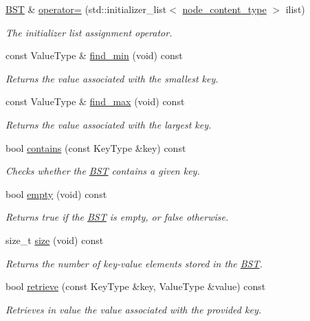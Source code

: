 \begin{DoxyCompactItemize}
\hyperlink{class_b_s_t}{B\+ST} \& \hyperlink{class_b_s_t_abcafcb893066444795e8145684011457}{operator=} (std\+::initializer\+\_\+list$<$ \hyperlink{class_b_s_t_a0aa9307cbee74945dbbbf659c398d4a1}{node\+\_\+content\+\_\+type} $>$ ilist)
\begin{DoxyCompactList}\small\item\em The initializer list assignment operator. \end{DoxyCompactList}\item 
const Value\+Type \& \hyperlink{class_b_s_t_a262042430a5671f2964ec55fd0db5887}{find\+\_\+min} (void) const 
\begin{DoxyCompactList}\small\item\em Returns the value associated with the smallest key. \end{DoxyCompactList}\item 
const Value\+Type \& \hyperlink{class_b_s_t_a1610824df7207dd077fec30b82174a9e}{find\+\_\+max} (void) const 
\begin{DoxyCompactList}\small\item\em Returns the value associated with the largest key. \end{DoxyCompactList}\item 
bool \hyperlink{class_b_s_t_a959aa07758e3ff26890e37db2a31b6b2}{contains} (const Key\+Type \&key) const 
\begin{DoxyCompactList}\small\item\em Checks whether the \hyperlink{class_b_s_t}{B\+ST} contains a given key. \end{DoxyCompactList}\item 
bool \hyperlink{class_b_s_t_a582ec5f3bc333f1e9c1deed3526e6a55}{empty} (void) const 
\begin{DoxyCompactList}\small\item\em Returns true if the \hyperlink{class_b_s_t}{B\+ST} is empty, or false otherwise. \end{DoxyCompactList}\item 
size\+\_\+t \hyperlink{class_b_s_t_a95dafd989628a5cf95f8e82151bbb432}{size} (void) const 
\begin{DoxyCompactList}\small\item\em Returns the number of key-\/value elements stored in the \hyperlink{class_b_s_t}{B\+ST}. \end{DoxyCompactList}\item 
bool \hyperlink{class_b_s_t_ad969e54369b6edee09f68b2b79a22f08}{retrieve} (const Key\+Type \&key, Value\+Type \&value) const 
\begin{DoxyCompactList}\small\item\em Retrieves in {\ttfamily value} the value associated with the provided key. \end{DoxyCompactList}\item 

\end{DoxyCompactItemize}
